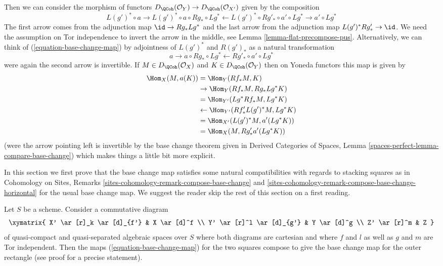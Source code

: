 \noindent
Then we can consider the
morphism of functors
$D_\QCoh(\mathcal{O}_Y) \to D_\QCoh(\mathcal{O}_{X'})$
given by the composition
\begin{equation}
\label{equation-base-change-map}
L(g')^* \circ a \to
L(g')^* \circ a \circ Rg_* \circ Lg^* \leftarrow
L(g')^* \circ Rg'_* \circ a' \circ Lg^* \to a' \circ Lg^*
\end{equation}
The first arrow comes from the adjunction map $\id \to Rg_* Lg^*$
and the last arrow from the adjunction map $L(g')^*Rg'_* \to \id$.
We need the assumption on Tor independence to invert the arrow
in the middle, see Lemma \ref{lemma-flat-precompose-pus}.
Alternatively, we can think of (\ref{equation-base-change-map}) by
adjointness of $L(g')^*$ and $R(g')_*$ as a natural transformation
$$
a \to a \circ Rg_* \circ Lg^* \leftarrow Rg'_* \circ a' \circ Lg^*
$$
were again the second arrow is invertible. If $M \in D_\QCoh(\mathcal{O}_X)$
and $K \in D_\QCoh(\mathcal{O}_Y)$
then on Yoneda functors this map is given by
\begin{align*}
\Hom_X(M, a(K))
& =
\Hom_Y(Rf_*M, K) \\
& \to
\Hom_Y(Rf_*M, Rg_* Lg^*K) \\
& =
\Hom_{Y'}(Lg^*Rf_*M, Lg^*K) \\
& \leftarrow
\Hom_{Y'}(Rf'_* L(g')^*M, Lg^*K) \\
& =
\Hom_{X'}(L(g')^*M, a'(Lg^*K)) \\
& =
\Hom_X(M, Rg'_*a'(Lg^*K))
\end{align*}
(were the arrow pointing left is invertible by the base
change theorem given in
Derived Categories of Spaces, Lemma
\ref{spaces-perfect-lemma-compare-base-change})
which makes things a little bit more explicit.

\medskip\noindent
In this section we first prove that the base change map satisfies
some natural compatibilities with regards to stacking squares as in
Cohomology on Sites, Remarks
\ref{sites-cohomology-remark-compose-base-change} and
\ref{sites-cohomology-remark-compose-base-change-horizontal}
for the usual base change map.
We suggest the reader skip the rest of this section on a first reading.

\begin{lemma}
\label{lemma-compose-base-change-maps}
Let $S$ be a scheme. Consider a commutative diagram
$$
\xymatrix{
X' \ar[r]_k \ar[d]_{f'} & X \ar[d]^f \\
Y' \ar[r]^l \ar[d]_{g'} & Y \ar[d]^g \\
Z' \ar[r]^m & Z
}
$$
of quasi-compact and quasi-separated algebraic spaces over $S$ where
both diagrams are cartesian and where $f$ and $l$
as well as $g$ and $m$ are Tor independent.
Then the maps (\ref{equation-base-change-map})
for the two squares compose to give the base
change map for the outer rectangle (see proof for a precise statement).
\end{lemma}

